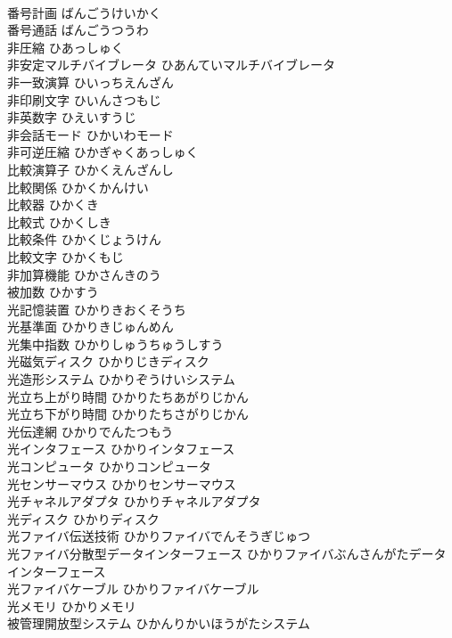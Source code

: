 \documentclass[8pt]{extreport}
\begin{document}
\begin{CJK}{UTF8}{min}
\\	番号計画	ばんごうけいかく	
\\	番号通話	ばんごうつうわ	
\\	非圧縮	ひあっしゅく	
\\	非安定マルチバイブレータ	ひあんていマルチバイブレータ	
\\	非一致演算	ひいっちえんざん	
\\	非印刷文字	ひいんさつもじ	
\\	非英数字	ひえいすうじ	
\\	非会話モード	ひかいわモード	
\\	非可逆圧縮	ひかぎゃくあっしゅく	
\\	比較演算子	ひかくえんざんし	
\\	比較関係	ひかくかんけい	
\\	比較器	ひかくき	
\\	比較式	ひかくしき	
\\	比較条件	ひかくじょうけん	
\\	比較文字	ひかくもじ	
\\	非加算機能	ひかさんきのう	
\\	被加数	ひかすう	
\\	光記憶装置	ひかりきおくそうち	
\\	光基準面	ひかりきじゅんめん	
\\	光集中指数	ひかりしゅうちゅうしすう	
\\	光磁気ディスク	ひかりじきディスク	
\\	光造形システム	ひかりぞうけいシステム	
\\	光立ち上がり時間	ひかりたちあがりじかん	
\\	光立ち下がり時間	ひかりたちさがりじかん	
\\	光伝達網	ひかりでんたつもう	
\\	光インタフェース	ひかりインタフェース	
\\	光コンピュータ	ひかりコンピュータ	
\\	光センサーマウス	ひかりセンサーマウス	
\\	光チャネルアダプタ	ひかりチャネルアダプタ	
\\	光ディスク	ひかりディスク	
\\	光ファイバ伝送技術	ひかりファイバでんそうぎじゅつ	
\\	光ファイバ分散型データインターフェース	ひかりファイバぶんさんがたデータインターフェース	
\\	光ファイバケーブル	ひかりファイバケーブル	
\\	光メモリ	ひかりメモリ	
\\	被管理開放型システム	ひかんりかいほうがたシステム	

\end{CJK}
\end{document}
